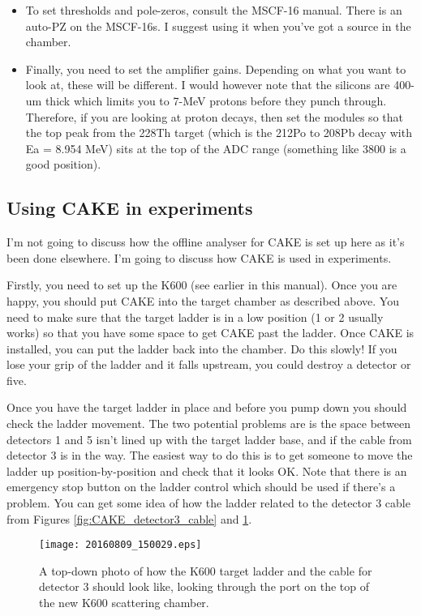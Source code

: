 \documentclass[11pt]{report}
\begin{document}
\begin{itemize}
\item To set thresholds and pole-zeros, consult the MSCF-16 manual. There is an auto-PZ on the MSCF-16s. I suggest using it when you've got a source in the chamber.

\item Finally, you need to set the amplifier gains. Depending on what you want to look at, these will be different. I would however note that the silicons are 400-um thick which limits you to 7-MeV protons before they punch through. Therefore, if you are looking at proton decays, then set the modules so that the top peak from the 228Th target (which is the 212Po to 208Pb decay with Ea = 8.954 MeV) sits at the top of the ADC range (something like 3800 is a good position).

\end{itemize}

\subsection{Using CAKE in experiments}

I'm not going to discuss how the offline analyser for CAKE is set up here as it's been done elsewhere. I'm going to discuss how CAKE is used in experiments.

Firstly, you need to set up the K600 (see earlier in this manual). Once you are happy, you should put CAKE into the target chamber as described above. You need to make sure that the target ladder is in a low position (1 or 2 usually works) so that you have some space to get CAKE past the ladder. Once CAKE is installed, you can put the ladder back into the chamber. Do this slowly! If you lose your grip of the ladder and it falls upstream, you could destroy a detector or five.

Once you have the target ladder in place and before you pump down you should check the ladder movement. The two potential problems are is the space between detectors 1 and 5 isn't lined up with the target ladder base, and if the cable from detector 3 is in the way. The easiest way to do this is to get someone to move the ladder up position-by-position and check that it looks OK. Note that there is an emergency stop button on the ladder control which should be used if there's a problem. You can get some idea of how the ladder related to the detector 3 cable from Figures \ref{fig:CAKE_detector3_cable} and \ref{fig:CAKE_detector3_cable_from_the_top}.

\begin{figure}
 \texttt{[image: 20160809\_150029.eps]}
 \caption{A top-down photo of how the K600 target ladder and the cable for detector 3 should look like, looking through the port on the top of the new K600 scattering chamber.}
 \label{fig:CAKE_detector3_cable_from_the_top}
\end{figure}
\end{document}
